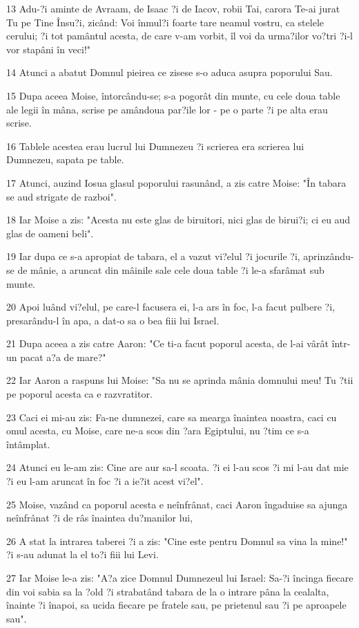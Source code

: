 \par 13 Adu-?i aminte de Avraam, de Isaac ?i de Iacov, robii Tai, carora Te-ai jurat Tu pe Tine Însu?i, zicând: Voi înmul?i foarte tare neamul vostru, ca stelele cerului; ?i tot pamântul acesta, de care v-am vorbit, îl voi da urma?ilor vo?tri ?i-l vor stapâni în veci!"
\par 14 Atunci a abatut Domnul pieirea ce zisese s-o aduca asupra poporului Sau.
\par 15 Dupa aceea Moise, întorcându-se; s-a pogorât din munte, cu cele doua table ale legii în mâna, scrise pe amândoua par?ile lor - pe o parte ?i pe alta erau scrise.
\par 16 Tablele acestea erau lucrul lui Dumnezeu ?i scrierea era scrierea lui Dumnezeu, sapata pe table.
\par 17 Atunci, auzind Iosua glasul poporului rasunând, a zis catre Moise: "În tabara se aud strigate de razboi".
\par 18 Iar Moise a zis: "Acesta nu este glas de biruitori, nici glas de birui?i; ci eu aud glas de oameni beli".
\par 19 Iar dupa ce s-a apropiat de tabara, el a vazut vi?elul ?i jocurile ?i, aprinzându-se de mânie, a aruncat din mâinile sale cele doua table ?i le-a sfarâmat sub munte.
\par 20 Apoi luând vi?elul, pe care-l facusera ei, l-a ars în foc, l-a facut pulbere ?i, presarându-l în apa, a dat-o sa o bea fiii lui Israel.
\par 21 Dupa aceea a zis catre Aaron: "Ce ti-a facut poporul acesta, de l-ai vârât într-un pacat a?a de mare?"
\par 22 Iar Aaron a raspuns lui Moise: "Sa nu se aprinda mânia domnului meu! Tu ?tii pe poporul acesta ca e razvratitor.
\par 23 Caci ei mi-au zis: Fa-ne dumnezei, care sa mearga înaintea noastra, caci cu omul acesta, cu Moise, care ne-a scos din ?ara Egiptului, nu ?tim ce s-a întâmplat.
\par 24 Atunci eu le-am zis: Cine are aur sa-l scoata. ?i ei l-au scos ?i mi l-au dat mie ?i eu l-am aruncat în foc ?i a ie?it acest vi?el".
\par 25 Moise, vazând ca poporul acesta e neînfrânat, caci Aaron îngaduise sa ajunga neînfrânat ?i de râs înaintea du?manilor lui,
\par 26 A stat la intrarea taberei ?i a zis: "Cine este pentru Domnul sa vina la mine!" ?i s-au adunat la el to?i fiii lui Levi.
\par 27 Iar Moise le-a zis: "A?a zice Domnul Dumnezeul lui Israel: Sa-?i încinga fiecare din voi sabia sa la ?old ?i strabatând tabara de la o intrare pâna la cealalta, înainte ?i înapoi, sa ucida fiecare pe fratele sau, pe prietenul sau ?i pe aproapele sau".
